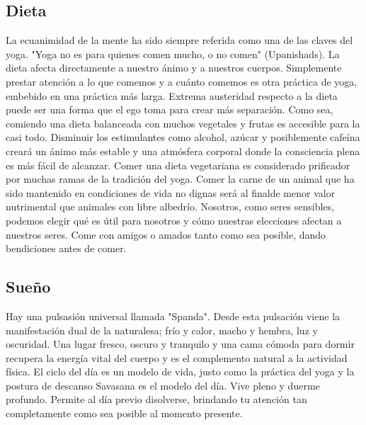 \subsection{Dieta}
La ecuanimidad de la mente ha sido siempre referida como una de las claves del yoga. "Yoga no es para quienes comen mucho, o no comen" (Upanishads). La dieta afecta directamente a nuestro ánimo y a nuestros cuerpos. Simplemente prestar atención a lo que comemos y a cuánto comemos es otra práctica de yoga, embebido en una práctica más larga. Extrema austeridad respecto a la dieta puede ser una forma que el ego toma para crear más separación. Como sea, comiendo una dieta balanceada con muchos vegetales y frutas es accesible para la casi todo. Disminuir los estimulantes como alcohol, azúcar y posiblemente cafeína creará un ánimo más estable y una atmósfera corporal donde la consciencia plena es más fácil de alcanzar. Comer una dieta vegetariana es considerado prificador por muchas ramas de la tradición del yoga. Comer la carne de un animal que ha sido mantenido en condiciones de vida no dignas será al finalde menor valor nutrimental que animales con libre albedrío. Nosotros, como seres sensibles, podemos elegir qué es útil para nosotros y cómo nuestras elecciones afectan a nuestros seres. Come con amigos o amados tanto como sea posible, dando bendiciones antes de comer.

\subsection{Sueño}
Hay una pulsasión universal llamada "Spanda". Desde esta pulsación viene la manifestación dual de la naturalesa; frío y calor, macho y hembra, luz y oscuridad. Una lugar fresco, oscuro y tranquilo y una cama cómoda para dormir recupera la energía vital del cuerpo y es el complemento natural a la actividad física. El ciclo del día es un modelo de vida, justo como la práctica del yoga y la postura de descanso Savasana es el modelo del día. Vive pleno y duerme profundo. Permite al día previo disolverse, brindando tu atención tan completamente como sea posible al momento presente.

